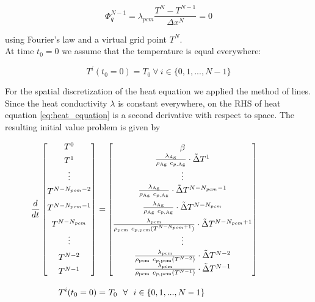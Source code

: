 \documentclass{scrartcl}[12pt, halfparskip]
\numberwithin{equation}{section}
\numberwithin{figure}{section}
\numberwithin{table}{section}
\begin{document}
\begin{equation}
	\Phi_q^{N-1} = \lambda_{pcm} \frac{T^N - T^{N-1}}{\Delta x^N} = 0
\end{equation}

using Fourier's law and a virtual grid point $T^N$. \\
At time $t_0=0$ we assume that the temperature is equal everywhere:

\begin{equation}
	T^i(t_0=0) = T_0 \ \forall \ i \in \{ 0,1,...,N-1 \}
\end{equation}

For the spatial discretization of the heat equation we applied the method of lines. Since the heat conductivity $\lambda$ is constant everywhere, on the RHS of heat equation \eqref{eq:heat_equation} is a second derivative with respect to space. The resulting initial value problem is given by

\begin{align}
\hspace{-2cm}
\frac{d}{dt} \begin{bmatrix*}
T^0 \\[1ex]
T^1 \\[0.3ex]
\vdots \\[1ex]
T^{N-N_{pcm}-2} \\[1.7ex]
T^{N-N_{pcm}-1} \\[1.7ex]
T^{N-N_{pcm}} \\[0.5ex]
\vdots \\[1.5ex]
T^{N-2} \\[1ex]
T^{N-1}
\end{bmatrix*} = &
\begin{bmatrix}
\beta \\
\frac{\lambda_{\text{Ag}}}{\rho_{\text{Ag}} \ c_{p,\text{Ag}}} \cdot \tilde{\Delta} T^1 \\[0.7ex]
\vdots \\[0.3ex]
\frac{\lambda_{\text{Ag}}}{\rho_{\text{Ag}} \ c_{p,\text{Ag}}} \cdot \tilde{\Delta} T^{N-N_{pcm}-1} \\[1.5ex]
\frac{\lambda_{\text{Ag}}}{\rho_{\text{Ag}} \ c_{p,\text{Ag}}} \cdot \tilde{\Delta} T^{N-N_{pcm}} \\[1.5ex]
\frac{\lambda_{\text{pcm}}}{\rho_{\text{pcm}} \ c_{p,{\text{pcm}}}(T^{N-N_{pcm}+1})} \cdot \tilde{\Delta} T^{N-N_{pcm}+1} \\[0.5ex]
\vdots \\[0.5ex]
\frac{\lambda_{\text{pcm}}}{\rho_{\text{pcm}} \ c_{p,{\text{pcm}}}(T^{N-2})} \cdot \tilde{\Delta} T^{N-2} \\[0.5ex]
\frac{\lambda_{\text{pcm}}}{\rho_{\text{pcm}} \ c_{p,\text{pcm}}(T^{N-1})} \cdot \tilde{\Delta} T^{N-1}
\end{bmatrix} \label{eq:heat_equation_discretized} \\[2ex]
T^i(t_0=0) = & \ T_0 \ \ \forall \ \ i \in \{ 0,1,...,N-1 \} \nonumber
\end{align}
\end{document}
